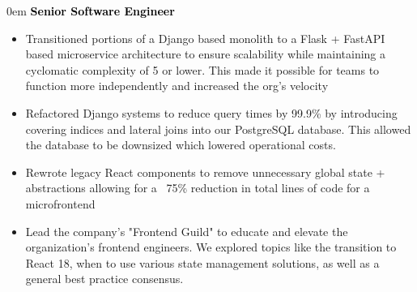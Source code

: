 \documentclass[11pt]{resume}
\begin{document}
    \noindent\begin{minipage}[t]{1\textwidth}
      \begin{addmargin}[.5em]{0em}
        \large{\bf \textcolor{black}{Senior Software Engineer}}
        \vspace{-.5em}
        \begin{itemize}
            \setlength\itemsep{-.1em}

            \item {Transitioned portions of a Django based monolith to a Flask
              + FastAPI based microservice architecture to ensure scalability
              while maintaining a cyclomatic complexity of 5 or lower. This
              made it possible for teams to function more independently and
              increased the org's velocity}

            \item {Refactored Django systems to reduce query times by 99.9\% by
              introducing covering indices and lateral joins into our
              PostgreSQL database. This allowed the database to be downsized
              which lowered operational costs.}

            \item {Rewrote legacy React components to remove unnecessary global
              state + abstractions allowing for a ~75\% reduction in total
              lines of code for a microfrontend}

            \item {Lead the company's "Frontend Guild" to educate and elevate
              the organization's frontend engineers. We explored topics like
              the transition to React 18, when to use various state management
              solutions, as well as a general best practice consensus.}

        \end{itemize}
      \end{addmargin}
    \end{minipage}

\end{document}
